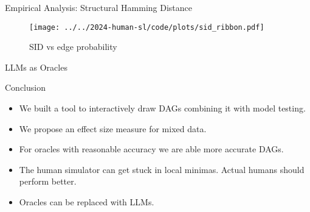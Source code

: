 \documentclass{beamer}
\begin{document}
\begin{frame}{Empirical Analysis: Structural Hamming Distance}
	\begin{figure}
		\centering
		\texttt{[image: ../../2024-human-sl/code/plots/sid\_ribbon.pdf]}
		\caption{SID vs edge probability}
	\end{figure}
\end{frame}

\begin{frame}{LLMs as Oracles}
\end{frame}

\begin{frame}{Conclusion}
	\begin{itemize}
		\item We built a tool to interactively draw DAGs combining it with model testing.
		\item We propose an effect size measure for mixed data.
		\item For oracles with reasonable accuracy we are able more accurate DAGs.
		\item The human simulator can get stuck in local minimas. Actual humans should perform better.
		\item Oracles can be replaced with LLMs.
	\end{itemize}
\end{frame}
\end{document}
